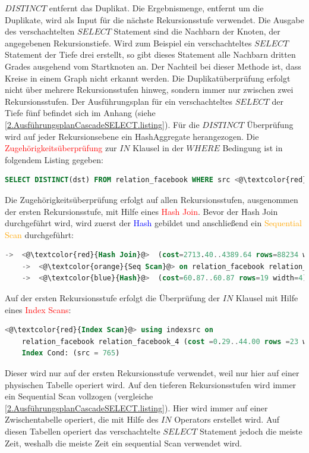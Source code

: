 $DISTINCT$ entfernt das Duplikat.
Die Ergebnismenge, entfernt um die Duplikate, wird als Input für die nächste Rekursionsstufe verwendet.
Die Ausgabe des verschachtelten $SELECT$ Statement sind die Nachbarn der Knoten, der angegebenen Rekursionstiefe.
Wird zum Beispiel ein verschachteltes $SELECT$ Statement der Tiefe drei erstellt, so gibt dieses Statement alle Nachbarn dritten Grades ausgehend vom Startknoten an.
Der Nachteil bei dieser Methode ist, dass Kreise in einem Graph nicht erkannt werden.
Die Duplikatüberprüfung erfolgt nicht über mehrere Rekursionsstufen hinweg, sondern immer nur zwischen zwei Rekursionsstufen.
Der Ausführungsplan für ein verschachteltes $SELECT$ der Tiefe fünf befindet sich im Anhang (siehe \ref{2.AusführungsplanCascadeSELECT.listing}).
Für die $DISTINCT$ Überprüfung wird auf jeder Rekursionsebene ein HashAggregate herangezogen.
Die \textcolor{red}{Zugehörigkeitsüberprüfung} zur $IN$ Klausel in der $WHERE$ Bedingung ist in folgendem Listing gegeben:
\begin{lstlisting}[language=SQL,caption = IN Klausel,frame=single, label={2.INKlauselFacebook.listing} ]
    SELECT DISTINCT(dst) FROM relation_facebook WHERE src <@\textcolor{red}{IN}@> ()
\end{lstlisting}
Die Zugehörigkeitsüberprüfung erfolgt auf allen Rekursionsstufen, ausgenommen der ersten Rekursionsstufe, mit Hilfe eines \textcolor{red}{Hash Join}.
Bevor der Hash Join durchgeführt wird, wird zuerst der \textcolor{blue}{Hash} gebildet und anschließend ein \textcolor{orange}{Sequential Scan} durchgeführt:
\begin{lstlisting}[language=SQL,caption = Aufruf der DISTINCT Funktion,frame=single, label={2.WhereConditionCTE.listing} ]
    ->  <@\textcolor{red}{Hash Join}@>  (cost=2713.40..4389.64 rows=88234 width=4) (actual time=11.821..17.797 rows=1709 loops=1)
    ->  <@\textcolor{orange}{Seq Scan}@> on relation_facebook relation_facebook_1  (cost=10000000000.00..10000001649.62 rows=100762 width=8) (actual time=0.004..4.822 rows=100762 loops=1)
    ->  <@\textcolor{blue}{Hash}@>  (cost=60.87..60.87 rows=19 width=4) (actual time=0.022..0.022 rows=4 loops=1)
\end{lstlisting}
Auf der ersten Rekursionsstufe erfolgt die Überprüfung der $IN$ Klausel mit Hilfe eines \textcolor{red}{Index Scans}:
\begin{lstlisting}[language=SQL,caption = IndexScanFacebookRelation,frame=single, label={2.indexScanFacebookRelation.listing} ]
    <@\textcolor{red}{Index Scan}@> using indexsrc on
    relation_facebook relation_facebook_4 (cost =0.29..44.00 rows =23 width =4) ( actual time =0.009..0.012 rows =27 loops =1)
    Index Cond: (src = 765)
\end{lstlisting}
Dieser wird nur auf der ersten Rekursionsstufe verwendet, weil nur hier auf einer physischen Tabelle operiert wird.
Auf den tieferen Rekursionsstufen wird immer ein Sequential Scan vollzogen (vergleiche \ref{2.AusführungsplanCascadeSELECT.listing}).
Hier wird immer auf einer Zwischentabelle operiert, die mit Hilfe des $IN$ Operators erstellet wird.
Auf diesen Tabellen operiert das verschachtelte $SELECT$ Statement jedoch die meiste Zeit, weshalb die meiste Zeit ein sequential Scan verwendet wird.
